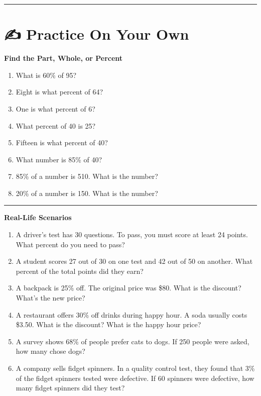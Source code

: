 \documentclass[
  letterpaper,
  DIV=11,
  numbers=noendperiod]{scrreprt}
\begin{document}
\begin{center}\rule{0.5\linewidth}{0.5pt}\end{center}

\section*{✍️ Practice On Your Own}\label{practice-on-your-own-5}


\textbf{Find the Part, Whole, or Percent}

\begin{enumerate}
\def\labelenumi{\arabic{enumi}.}
\item
  What is 60\% of 95?
\item
  Eight is what percent of 64?
\item
  One is what percent of 6?
\item
  What percent of 40 is 25?
\item
  Fifteen is what percent of 40?
\item
  What number is 85\% of 40?
\item
  85\% of a number is 510. What is the number?
\item
  20\% of a number is 150. What is the number?
\end{enumerate}

\begin{center}\rule{0.5\linewidth}{0.5pt}\end{center}

\textbf{Real-Life Scenarios}

\begin{enumerate}
\def\labelenumi{\arabic{enumi}.}
\setcounter{enumi}{8}
\item
  A driver's test has 30 questions. To pass, you must score at least 24
  points. What percent do you need to pass?
\item
  A student scores 27 out of 30 on one test and 42 out of 50 on another.
  What percent of the total points did they earn?
\item
  A backpack is 25\% off. The original price was \$80. What is the
  discount? What's the new price?
\item
  A restaurant offers 30\% off drinks during happy hour. A soda usually
  costs \$3.50. What is the discount? What is the happy hour price?
\item
  A survey shows 68\% of people prefer cats to dogs. If 250 people were
  asked, how many chose dogs?
\item
  A company sells fidget spinners. In a quality control test, they found
  that 3\% of the fidget spinners tested were defective. If 60 spinners
  were defective, how many fidget spinners did they test?
\end{enumerate}
\end{document}
